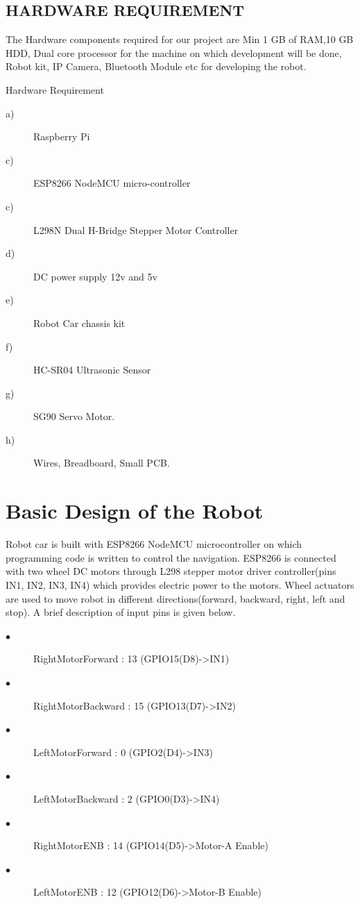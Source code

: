 \documentclass[sigconf]{acmart}
\begin{document}
\subsection{HARDWARE REQUIREMENT}
The Hardware components required for our project are Min 1 GB of RAM,10 GB HDD, Dual core processor for the machine on which development will be done, Robot kit, IP Camera, Bluetooth Module etc for developing the robot.

Hardware Requirement
\begin{description}
\item[a)] Raspberry Pi
\item[c)] ESP8266 NodeMCU micro-controller
\item[c)] L298N Dual H-Bridge Stepper Motor Controller
\item[d)] DC power supply 12v and 5v
\item[e)] Robot Car chassis kit
\item[f)] HC-SR04 Ultrasonic Sensor
\item[g)] SG90 Servo Motor.
\item[h)] Wires, Breadboard, Small PCB.
\end{description}

\section{Basic Design of the Robot}
Robot car is built with ESP8266 NodeMCU microcontroller on which programming code is written to control the navigation. ESP8266 is connected with two wheel DC motors through L298 stepper motor driver controller(pins IN1, IN2, IN3, IN4) which provides electric power to the motors. Wheel actuators are used to move robot in different directions(forward, backward, right, left and stop).
A brief description of input pins is given below.
\begin{description}
    \item[$\bullet$] RightMotorForward  : 13  (GPIO15(D8)->IN1)
    \item[$\bullet$] RightMotorBackward : 15 (GPIO13(D7)->IN2)
    \item[$\bullet$] LeftMotorForward   : 0    (GPIO2(D4)->IN3)
    \item[$\bullet$] LeftMotorBackward  : 2   (GPIO0(D3)->IN4)
    \item[$\bullet$] RightMotorENB      : 14 (GPIO14(D5)->Motor-A Enable)
    \item[$\bullet$] LeftMotorENB       : 12  (GPIO12(D6)->Motor-B Enable)
\end{description}
\end{document}
